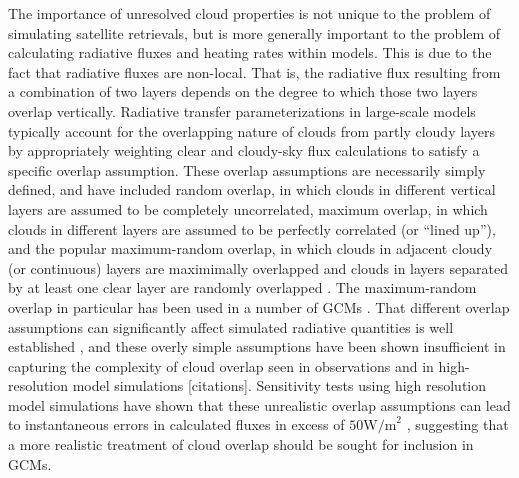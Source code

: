 The importance of unresolved cloud properties is not unique to the
problem of simulating satellite retrievals, but is more generally
important to the problem of calculating radiative fluxes and heating
rates within models. This is due to the fact that radiative fluxes are
non-local. That is, the radiative flux resulting from a combination of
two layers depends on the degree to which those two layers overlap
vertically. Radiative transfer parameterizations in large-scale models
typically account for the overlapping nature of clouds from partly
cloudy layers by appropriately weighting clear and cloudy-sky flux
calculations to satisfy a specific overlap assumption. These overlap
assumptions are necessarily simply defined, and have included random
overlap, in which clouds in different vertical layers are assumed to be
completely uncorrelated, maximum overlap, in which clouds in different
layers are assumed to be perfectly correlated (or ``lined up''), and the
popular maximum-random overlap, in which clouds in adjacent cloudy (or
continuous) layers are maximimally overlapped and clouds in layers
separated by at least one clear layer are randomly overlapped
\citep{geleyn_and_hollingsworth_1979, tian_and_curry_1989}. The
maximum-random overlap in particular has been used in a number of GCMs
\citep[e.g.;][]{collins_et_al_2004, neale_et_al_2010a, neale_et_al_2010b}.
That different overlap assumptions can significantly affect simulated
radiative quantities is well established
\citep[e.g.,][]{morcrette_and_fouquart_1986, stubenrauch_et_al_1997, barker_et_al_1999},
and these overly simple assumptions have been shown insufficient in
capturing the complexity of cloud overlap seen in observations
\citep{hogan_and_illingworth_2000, mace_and_benson-troth_2002, barker_2008}
and in high-resolution model simulations {[}citations{]}. Sensitivity
tests using high resolution model simulations have shown that these
unrealistic overlap assumptions can lead to instantaneous errors in
calculated fluxes in excess of \(50 \textrm{W/m}^2\)
\citep{barker_et_al_1999, wu_and_liang_2005}, suggesting that a more
realistic treatment of cloud overlap should be sought for inclusion in
GCMs.


